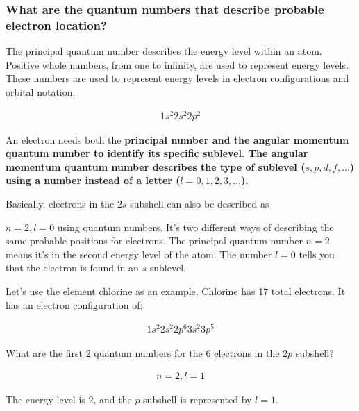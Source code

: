 
\subsubsection*{What are the quantum numbers that describe probable electron location?}

\begin{definition}
    The principal quantum number describes the energy level within an atom.
    Positive whole numbers, from one to infinity, are used to represent energy
    levels. These numbers are used to represent energy levels in electron
    configurations and orbital notation.

    \begin{align}
        1s^{2}2s^{2}2p^{2}
    \end{align}
\end{definition}

\begin{definition}
    An electron needs both the \bf{principal number} and the \bf{angular
    momentum quantum number} to identify its specific sublevel. The angular
    momentum quantum number describes the type of sublevel
    ($s, p, d, f, \ldots$) using a number instead of a letter
    ($l = 0, 1, 2, 3, \ldots$).

    Basically, electrons in the $2s$ subshell can also be described as
    
    $n = 2, l = 0$ using quantum numbers. It's two different ways of describing
    the same probable positions for electrons. The principal quantum number $n = 2$
    means it's in the second energy level of the atom. The number $l = 0$ tells
    you that the electron is found in an $s$ sublevel.
    
    Let's use the element chlorine as an example. Chlorine has 17 total
    electrons. It has an electron configuration of:

    \begin{align}
        1s^{2}2s^{2}2p^{6}3s^{2}3p^{5}
    \end{align}
    
    What are the first $2$ quantum numbers for the $6$ electrons in the $2p$ subshell?

    \begin{align}
        n = 2, l = 1
    \end{align}

    The energy level is $2$, and  the $p$ subshell is represented by $l = 1$.
\end{definition}

